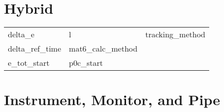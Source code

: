 \section{Hybrid}
 \label{s:list.hybrid}
 
 \begin{tabular}{lll} \toprule
delta_e                     & l                           & tracking_method             \\
delta_ref_time              & mat6_calc_method            &                             \\
e_tot_start                 & p0c_start                   &                             \\
 \bottomrule
 \end{tabular}
 \vfill
 
 \section{Instrument, Monitor, and Pipe}
 \label{s:list.instrument}
 
